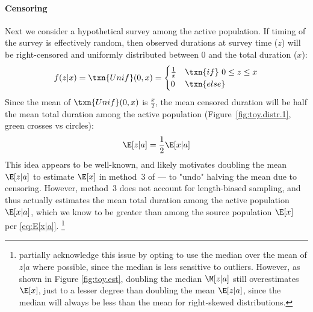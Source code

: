 \paragraph{Censoring}
Next we consider a hypothetical survey among the active population.
If timing of the survey is effectively random, then
observed durations at survey time ($z$) will be right-censored
and uniformly distributed between 0 and the total duration ($x$):
\begin{equation}
  f(z|x) = \txn{Unif}(0,x) =
  \begin{cases}
    \frac{1}{x} & \txn{if}~ 0 \le z \le x \\
    0 & \txn{else}
  \end{cases}
  \label{eq:f(z|x)}
\end{equation}
Since the mean of $\txn{Unif}(0,x)$ is $\frac{x}{2}$,
the mean censored duration will be half
the mean total duration among the active population
(Figure~\ref{fig:toy.distr.1}, green crosses vs circles):
\begin{equation}
  \E[z|a] = \frac{1}{2} \E[x|a]
  \label{eq:E[z|a]}
\end{equation}
This idea appears to be well-known, and likely motivates
doubling the mean $\E[z|a]$ to estimate $\E[x]$ in method~3 of \cite{Fazito2012}
--- \ie to "undo" halving the mean due to censoring.
However, method~3 does not account for length-biased sampling,
and thus actually estimates the mean total duration among the active population $\E[x|a]$,
which we know to be greater than among the source population $\E[x]$ per \eqref{eq:E[x|a]}.%
\footnote{\citet{Fazito2012} partially acknowledge this issue
  by opting to use the median over the mean of $z|a$ where possible,
  since the median is less sensitive to outliers.
  However, as shown in Figure \ref{fig:toy.est},
  doubling the median $\M[z|a]$ still overestimates $\E[x]$,
  just to a lesser degree than doubling the mean $\E[z|a]$,
  since the median will always be less than the mean for right-skewed distributions.}
